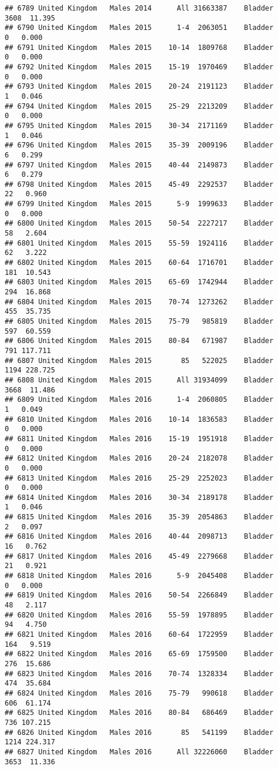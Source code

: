 \documentclass[
]{article}
\begin{document}
\begin{verbatim}
## 6789 United Kingdom   Males 2014      All 31663387    Bladder   3608  11.395
## 6790 United Kingdom   Males 2015      1-4  2063051    Bladder      0   0.000
## 6791 United Kingdom   Males 2015    10-14  1809768    Bladder      0   0.000
## 6792 United Kingdom   Males 2015    15-19  1970469    Bladder      0   0.000
## 6793 United Kingdom   Males 2015    20-24  2191123    Bladder      1   0.046
## 6794 United Kingdom   Males 2015    25-29  2213209    Bladder      0   0.000
## 6795 United Kingdom   Males 2015    30-34  2171169    Bladder      1   0.046
## 6796 United Kingdom   Males 2015    35-39  2009196    Bladder      6   0.299
## 6797 United Kingdom   Males 2015    40-44  2149873    Bladder      6   0.279
## 6798 United Kingdom   Males 2015    45-49  2292537    Bladder     22   0.960
## 6799 United Kingdom   Males 2015      5-9  1999633    Bladder      0   0.000
## 6800 United Kingdom   Males 2015    50-54  2227217    Bladder     58   2.604
## 6801 United Kingdom   Males 2015    55-59  1924116    Bladder     62   3.222
## 6802 United Kingdom   Males 2015    60-64  1716701    Bladder    181  10.543
## 6803 United Kingdom   Males 2015    65-69  1742944    Bladder    294  16.868
## 6804 United Kingdom   Males 2015    70-74  1273262    Bladder    455  35.735
## 6805 United Kingdom   Males 2015    75-79   985819    Bladder    597  60.559
## 6806 United Kingdom   Males 2015    80-84   671987    Bladder    791 117.711
## 6807 United Kingdom   Males 2015       85   522025    Bladder   1194 228.725
## 6808 United Kingdom   Males 2015      All 31934099    Bladder   3668  11.486
## 6809 United Kingdom   Males 2016      1-4  2060805    Bladder      1   0.049
## 6810 United Kingdom   Males 2016    10-14  1836583    Bladder      0   0.000
## 6811 United Kingdom   Males 2016    15-19  1951918    Bladder      0   0.000
## 6812 United Kingdom   Males 2016    20-24  2182078    Bladder      0   0.000
## 6813 United Kingdom   Males 2016    25-29  2252023    Bladder      0   0.000
## 6814 United Kingdom   Males 2016    30-34  2189178    Bladder      1   0.046
## 6815 United Kingdom   Males 2016    35-39  2054863    Bladder      2   0.097
## 6816 United Kingdom   Males 2016    40-44  2098713    Bladder     16   0.762
## 6817 United Kingdom   Males 2016    45-49  2279668    Bladder     21   0.921
## 6818 United Kingdom   Males 2016      5-9  2045408    Bladder      0   0.000
## 6819 United Kingdom   Males 2016    50-54  2266849    Bladder     48   2.117
## 6820 United Kingdom   Males 2016    55-59  1978895    Bladder     94   4.750
## 6821 United Kingdom   Males 2016    60-64  1722959    Bladder    164   9.519
## 6822 United Kingdom   Males 2016    65-69  1759500    Bladder    276  15.686
## 6823 United Kingdom   Males 2016    70-74  1328334    Bladder    474  35.684
## 6824 United Kingdom   Males 2016    75-79   990618    Bladder    606  61.174
## 6825 United Kingdom   Males 2016    80-84   686469    Bladder    736 107.215
## 6826 United Kingdom   Males 2016       85   541199    Bladder   1214 224.317
## 6827 United Kingdom   Males 2016      All 32226060    Bladder   3653  11.336
\end{verbatim}
\end{document}
